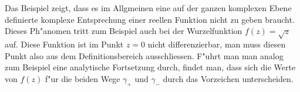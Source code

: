 Das Beispiel zeigt, dass es im Allgmeinen eine auf der ganzen komplexen
Ebene definierte komplexe Entsprechung einer reellen Funktion nicht
zu geben braucht.
Dieses Ph"anomen tritt zum Beispiel auch bei der Wurzelfunktion $f(z)=\sqrt{z}$
auf.
Diese Funktion ist im Punkt $z=0$ nicht differenzierbar, man muss diesen
Punkt also aus dem Definitionsbereich ausschliessen.
F"uhrt man man analog zum Beispiel eine analytische Fortsetzung durch,
findet man, dass sich die Werte von $f(z)$ f"ur die beiden Wege $\gamma_+$
und $\gamma_-$ durch das Vorzeichen unterscheiden.


